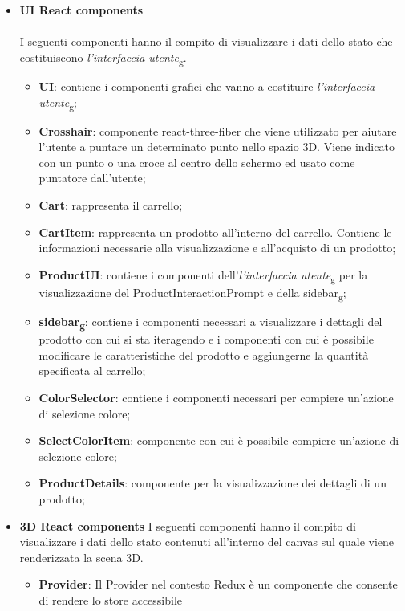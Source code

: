 \begin{itemize}
		\item \textbf{\large UI React components}
		\\\\
		I seguenti componenti hanno il compito di visualizzare i dati dello stato che costituiscono \textit{l'interfaccia 
		utente}\textsubscript{g}. 
		\begin{itemize}
			\item \textbf{UI}: contiene i componenti grafici che vanno a costituire \textit{l'interfaccia 
			utente}\textsubscript{g}; 
			\item \textbf{Crosshair}: componente react-three-fiber che viene utilizzato per aiutare l'utente a puntare
			un determinato punto nello spazio 3D.
			Viene indicato con un punto o una croce al centro dello schermo ed usato come puntatore dall'utente;
			\item \textbf{Cart}: rappresenta il carrello;
			\item \textbf{CartItem}: rappresenta un prodotto all'interno del carrello.
			Contiene le informazioni necessarie alla visualizzazione e all'acquisto di un prodotto;
			\item \textbf{ProductUI}: contiene i componenti dell'\textit{l'interfaccia 
		utente}\textsubscript{g} per la visualizzazione
			del ProductInteractionPrompt e della sidebar\textsubscript{g};
			\item \textbf{sidebar\textsubscript{g}}: contiene i componenti necessari a visualizzare i 
			dettagli del prodotto con cui si sta iteragendo e i componenti con cui è possibile modificare le caratteristiche del 
			prodotto e aggiungerne la quantità specificata al carrello;
			\item \textbf{ColorSelector}: contiene i componenti necessari per compiere un'azione di selezione colore;
			\item \textbf{SelectColorItem}: componente con cui è possibile compiere un'azione di selezione colore;
			\item \textbf{ProductDetails}: componente per la visualizzazione dei dettagli di un prodotto;
		\end{itemize}
		\item \textbf{\large 3D React components}
		I seguenti componenti hanno il compito di visualizzare i dati dello stato contenuti all'interno del canvas 
		sul quale viene renderizzata la scena 3D.
		\begin{itemize}
			\item \textbf{Provider}: Il Provider nel contesto Redux è un componente che consente di rendere lo store accessibile

\end{itemize}
\end{itemize}
